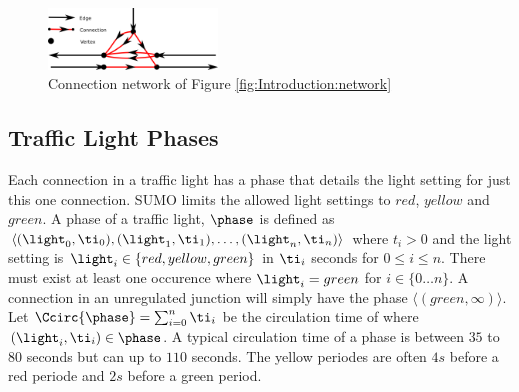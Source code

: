 \begin{figure}[h]
\centering
\includegraphics[width=0.4\textwidth]{../images/ConnectionNetwork.png}
\caption{Connection network of Figure \ref{fig:Introduction:network}}
\label{fig:Model:Connection}
\end{figure}

\subsection{Traffic Light Phases}\label{sec:phases}
Each connection in a traffic light has a phase that details the light setting for just this one connection.
SUMO limits the allowed light settings to $red$, $yellow$ and $green$.
A phase of a traffic light, $\phase$ is defined as $\langle(\light_0, \ti_0),(\light_1, \ti_1),\dots, (\light_n, \ti_n) \rangle$ where $t_i>0$ and the light setting is $\light_i\in \{red, yellow, green\}$ in $\ti_i$ seconds for $0 \leq i \leq n$.
There must exist at least one occurence where $\light_i = green$ for $i \in \{0 \dots n\}$. 
A connection in an unregulated junction will simply have the phase $\langle(green, \infty)\rangle$.
Let $\Ccirc{\phase} = \sum_{i=0}^{n}\ti_i$ be the circulation time of \phase where $(\light_i, \ti_i)\in \phase$.
A typical circulation time of a phase is between $35$ to $80$ seconds but can up to $110$ seconds. 
The yellow periodes are often $4s$ before a red periode and $2s$ before a green period\cite{vejtrafik}.

